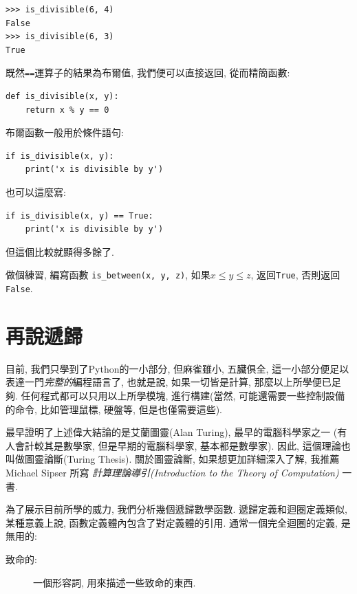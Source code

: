 \documentclass[10pt]{book}
\begin{document}
\begin{verbatim}
>>> is_divisible(6, 4)
False
>>> is_divisible(6, 3)
True
\end{verbatim}
%
 既然{\tt ==}運算子的結果為布爾值, 
我們便可以直接返回, 從而精簡函數:

\begin{verbatim}
def is_divisible(x, y):
    return x % y == 0
\end{verbatim}
%
布爾函數一般用於條件語句:

\begin{verbatim}
if is_divisible(x, y):
    print('x is divisible by y')
\end{verbatim}
%
也可以這麼寫:

\begin{verbatim}
if is_divisible(x, y) == True:
    print('x is divisible by y')
\end{verbatim}
%
但這個比較就顯得多餘了. 

做個練習, 編寫函數 \verb"is_between(x, y, z)", 
如果$x \le y \le z$, 返回{\tt True}, 否則返回{\tt False}.


\section{再說遞歸}
\label{more.recursion}

目前, 我們只學到了Python的一小部分, 但麻雀雖小, 五臟俱全, 
這一小部分便足以表達一門{\em 完整的}編程語言了, 
也就是說, 如果一切皆是計算, 那麼以上所學便已足夠. 
任何程式都可以只用以上所學模塊, 進行構建(當然, 可能還需要一些控制設備
的命令, 比如管理鼠標, 硬盤等, 但是也僅需要這些).

最早證明了上述偉大結論的是艾蘭圖靈(Alan Turing), 最早的電腦科學家之一
(有人會計較其是數學家, 但是早期的電腦科學家, 基本都是數學家). 
因此, 這個理論也叫做圖靈論斷(Turing Thesis). 
關於圖靈論斷, 如果想更加詳細深入了解, 我推薦 Michael Sipser 所寫
 {\em 計算理論導引(Introduction to the Theory of Computation)} 一書.

為了展示目前所學的威力, 我們分析幾個遞歸數學函數. 
遞歸定義和迴圈定義類似, 某種意義上說, 函數定義體內包含了對定義體的引用. 
通常一個完全迴圈的定義, 是無用的:

\begin{description}

\item[致命的:] 一個形容詞, 用來描述一些致命的東西.

\end{description}
\end{document}
